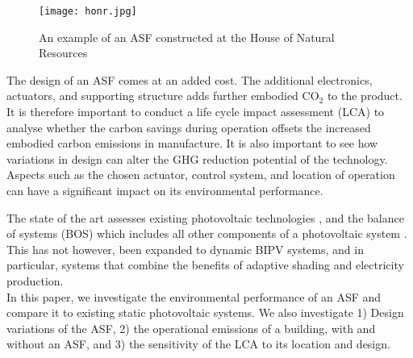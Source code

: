 \begin{figure}
\begin{center}
\texttt{[image: honr.jpg]}
\caption{An example of an ASF constructed at the House of Natural Resources \cite{nagy2015frontiers}}
\label{fig:HoNR}
\end{center}
\end{figure}

The design of an ASF comes at an added cost. The additional electronics, actuators, and supporting structure adds further embodied CO$_2$ to the product. It is therefore important to conduct a life cycle impact assessment (LCA) to analyse whether the carbon savings during operation offsets the increased embodied carbon emissions in manufacture. It is also important to see how variations in design can alter the GHG reduction potential of the technology. Aspects such as the chosen actuator, control system, and location of operation can have a significant impact on its environmental performance. 

The state of the art assesses existing photovoltaic technologies \cite{raugei2007life} \cite{de2013energy} \cite{fthenakis2011photovoltaics}, and the balance of systems (BOS) which includes all other components of a photovoltaic system \cite{mason2006energy}. This has not however, been expanded to dynamic BIPV systems, and in particular, systems that combine the benefits of adaptive shading and electricity production.\\



In this paper, we investigate the environmental performance of an ASF and compare it to existing static photovoltaic systems. We also investigate 1) Design variations of the ASF, 2) the operational emissions of a building, with and without an ASF, and 3) the sensitivity of the LCA to its location and design.



